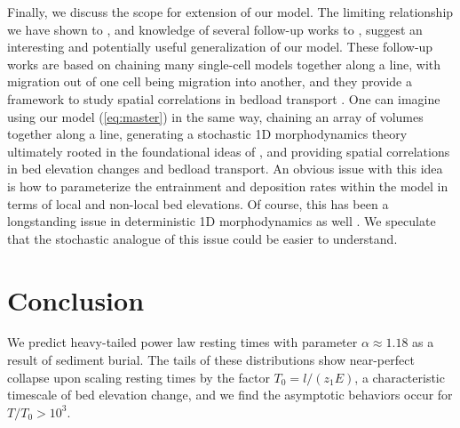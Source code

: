 \documentclass[draft]{agujournal2018}
\begin{document}
Finally, we discuss the scope for extension of our model.
The limiting relationship we have shown to \citet{Ancey2008}, and knowledge of several follow-up works to \citet{Ancey2008} \citep[e.g.][]{Ancey2014a, Heyman2014, Heyman2015}, suggest an interesting and potentially useful generalization of our model.
These follow-up works are based on chaining many \citet{Ancey2008} single-cell models together along a line, with migration out of one cell being migration into another, and they provide a framework to study spatial correlations in bedload transport \citep[e.g.][]{Heyman2014,Heyman2015}.
One can imagine using our model (\ref{eq:master}) in the same way, chaining an array of volumes together along a line, generating a stochastic 1D morphodynamics theory ultimately rooted in the foundational ideas of \citet{Einstein1950}, and providing spatial correlations in bed elevation changes and bedload transport.
An obvious issue with this idea is how to parameterize the entrainment and deposition rates within the model in terms of local and non-local bed elevations.
Of course, this has been a longstanding issue in deterministic 1D morphodynamics as well \citep[e.g.][]{Tucker2010}.
We speculate that the stochastic analogue of this issue could be easier to understand.





























\section{Conclusion}


We predict heavy-tailed power law resting times with parameter $\alpha \approx 1.18$ as a result of sediment burial.
The tails of these distributions show near-perfect collapse upon scaling resting times by the factor $T_0 = l/(z_1 E)$, a characteristic timescale of bed elevation change, and we find the asymptotic behaviors occur for $T/T_0>10^3$.
\end{document}
